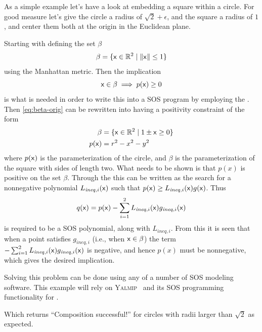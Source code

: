 \begin{example}

  As a simple example let's have a look at embedding a square within a circle.
  For good measure let's give the circle a radius of \(\sqrt{2}+\epsilon\), and
  the square a radius of \(1\), and center them both at the origin in the
  Euclidean plane.

  Starting with defining the set \(\beta\)
  \begin{equation}
    \label{eq:beta-orig}
    \beta = \lbrace{\mathbf{\mathsf{x}}} \in \mathbb{R}^2 \mid \lVert{\mathbf{\mathsf{x}}}\rVert \leq 1\rbrace
  \end{equation} 
  using the Manhattan metric. Then the implication
  \begin{equation}
    {\mathbf{\mathsf{x}}} \in \beta \implies p({\mathbf{\mathsf{x}}}) \geq 0
  \end{equation}
  is what is needed in order to write this into a \ac{SOS} program by employing
  the . Then \eqref{eq:beta-orig} can be rewritten into
  having a positivity constraint of the form
  \begin{align}
    \beta &= \lbrace{\mathbf{\mathsf{x}}} \in \mathbb{R}^2 \mid 1 \pm {\mathbf{\mathsf{x}}} \geq 0 \rbrace \\
    p({\mathbf{\mathsf{x}}}) &= r^2 - x^2 - y^2
  \end{align}
  where \(p({\mathbf{\mathsf{x}}})\) is the parameterization of the circle, and \(\beta\) is
  the parameterization of the square with sides of length two. What needs to be
  shown is that \(p(x)\) is positive on the set \(\beta\). Through the
   this can be written as the search for a nonnegative
  polynomial \(L_{\mathit{ineq},i}({\mathbf{\mathsf{x}}})\) such that \(p({\mathbf{\mathsf{x}}}) \geq
  L_{\mathit{ineq},i}({\mathbf{\mathsf{x}}})g({\mathbf{\mathsf{x}}}) \). Thus
  \begin{equation}
    q({\mathbf{\mathsf{x}}}) = p({\mathbf{\mathsf{x}}}) -
    \sum_{i=1}^{2}L_{\mathit{ineq},i}({\mathbf{\mathsf{x}}})g_{\mathit{ineq},i}({\mathbf{\mathsf{x}}})
  \end{equation} 
  is required to be a \ac{SOS} polynomial, along with \(L_{\mathit{ineq},i}\). From this
  it is seen that when a point satisfies \(g_{\mathit{ineq},i}\) (i.e., when \({\mathbf{\mathsf{x}}} \in
  \beta\)) the term \( - \sum_{i=1}^{2}L_{\mathit{ineq},i}({\mathbf{\mathsf{x}}})g_{\mathit{ineq},i}({\mathbf{\mathsf{x}}})\)
  is negative, and hence \(p(x)\) must be nonnegative, which gives the desired
  implication.

  Solving this problem can be done using any of a number of \ac{SOS} modeling
  software. This example will rely on \textsc{Yalmip}~\cite{Lofberg2004} and its
  \ac{SOS} programming functionality \cite{Lofberg2009} for \matlab.


  

  Which returns ``Composition successful!'' for circles with radii larger than
  \(\sqrt{2}\) as expected.
\end{example}

